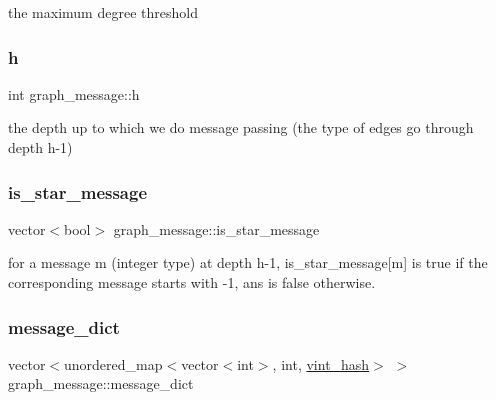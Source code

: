 the maximum degree threshold 

\mbox{\label{classgraph__message_a934d63ed7275c211e13c6fb68824ed46}} 
\subsubsection{\texorpdfstring{h}{h}}
{\footnotesize\ttfamily int graph\+\_\+message\+::h\hspace{0.3cm}{\ttfamily [private]}}



the depth up to which we do message passing (the type of edges go through depth h-\/1) 

\mbox{\label{classgraph__message_a55ff5531a0043106369e84a7bc45e22d}} 
\subsubsection{\texorpdfstring{is\+\_\+star\+\_\+message}{is\_star\_message}}
{\footnotesize\ttfamily vector$<$bool$>$ graph\+\_\+message\+::is\+\_\+star\+\_\+message}



for a message m (integer type) at depth h-\/1, is\+\_\+star\+\_\+message\mbox{[}m\mbox{]} is true if the corresponding message starts with -\/1, ans is false otherwise. 

\mbox{\label{classgraph__message_ab54d89b122c2b1322da0d5db2043fb84}} 
\subsubsection{\texorpdfstring{message\+\_\+dict}{message\_dict}}
{\footnotesize\ttfamily vector$<$unordered\+\_\+map$<$vector$<$int$>$, int, \hyperlink{structvint__hash}{vint\+\_\+hash}$>$ $>$ graph\+\_\+message\+::message\+\_\+dict}



